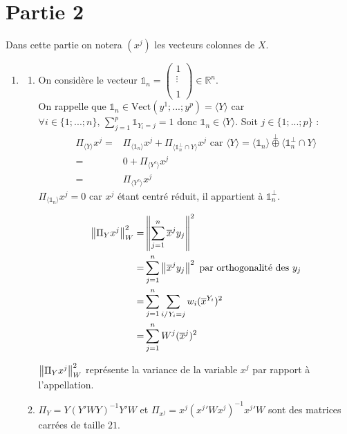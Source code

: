 \documentclass{article}
\begin{document}
\section{Partie 2}

Dans cette partie on notera $(x^j)$ les vecteurs colonnes de $X$. 

\begin{enumerate}
\item 
	\begin{enumerate}
	\item On considère le vecteur $\mathds{1}_n=\begin{pmatrix}
	1 \\ 
	\vdots \\ 
	 \\ 
	1
	\end{pmatrix} \in\mathbb{R}^{n}$.\\
	 On rappelle que $\mathds{1}_n\in \text{Vect}\left(y^1;...;y^p\right)=\langle Y \rangle$ car $\forall i\in\{1;...;n\},\, \sum_{j=1}^p \mathds{1}_{Y_i=j}=1$ donc $\mathds{1}_n\in \langle Y \rangle$.
Soit $j\in\{1;...;p\}$ :
	\begin{align*}
	\Pi_{\langle Y \rangle} x^j =& \Pi_{\langle\mathds{1}_n\rangle}x^j +\Pi_{\langle \mathds{1}_n^{\perp} \cap Y \rangle} x^j  \text{ car } \langle Y \rangle = \langle \mathds{1}_n \rangle \overset{\perp}{\oplus}\langle \mathds{1}_n^{\perp} \cap Y \rangle \\
	  =& 0 + \Pi_{\langle Y^c \rangle} x^j \\
	  =& \Pi_{\langle Y^c \rangle} x^j
	\end{align*}
 $\Pi_{\langle\mathds{1}_n\rangle}x^j=0$ car $x^j$ étant centré réduit, il appartient à $\mathds{1}_n^{\perp}$.

\begin{align*}
\left\| \Pi_Y x^j\right\|^2_{W} =& \left\| \sum_{j=1}^n \overline{x}^j y_j\right\|^2 \\
=& \sum_{j=1}^n \left\| \overline{x}^j y_j\right\|^2 \text{ par orthogonalité des $y_j$} \\
					   =& \sum_{j=1}^n \sum_{i/Y_i=j} w_i (\overline{x}^{Y_i})^2 \\ 
					   =& \sum_{j=1}^n W^j (\overline{x}^j)^2 
\end{align*}
 
 
 
	
	$\left\| \Pi_Yx^j\right\|^2_{W}$ représente la variance de la variable $x^j$ par rapport à l'appellation.
	
	\item $\Pi_Y=Y\left(Y'WY\right)^{-1}Y'W$  et $\Pi_{x^j}=x^{j}\left({x^{j}}'Wx^{j}\right)^{-1}{x^{j}}'W$ sont des matrices carrées de taille $21$.\\


\end{enumerate}
\end{enumerate}
\end{document}
